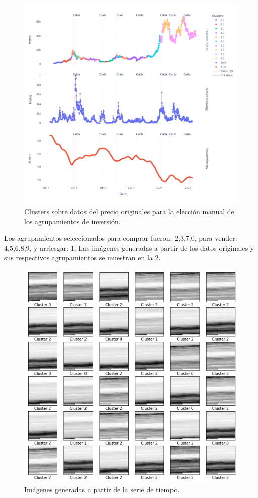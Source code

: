 \begin{figure}[h!]
	\centering
	\includegraphics[scale=0.5]{Chapter5/clasifica_inv2.png}
	\caption{Clusters sobre datos del precio originales para la elección manual de los agrupamientos de inversión.}
	\label{fig29}
\end{figure}

Los agrupamientos seleccionados para comprar fueron: 2,3,7,0, para vender: 4,5,6,8,9, y arriesgar: 1.
Las imágenes generadas a partir de los datos originales y sus respectivos agrupamientos se muestran en la \cref{fig30}. 

\begin{figure}[h!]
	\centering
	\includegraphics[scale=0.5]{Chapter5/IMG_cluster.png}
	\caption{Imágenes generadas a partir de la serie de tiempo.}
	\label{fig30}
\end{figure}

